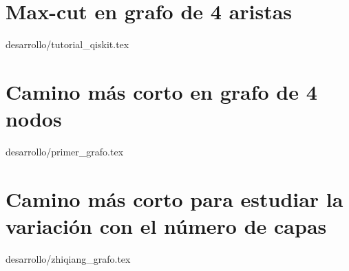 \section{Max-cut en grafo de 4 aristas\label{sec:4-tutorial_de_qiskit}}{desarrollo/tutorial_qiskit.tex}

\section{Camino más corto en grafo de 4 nodos\label{sec:4-primer_grafo}}{desarrollo/primer_grafo.tex}

\section{Camino más corto para estudiar la variación con el número de capas\label{sec:4-zhiqiang}}{desarrollo/zhiqiang_grafo.tex}

